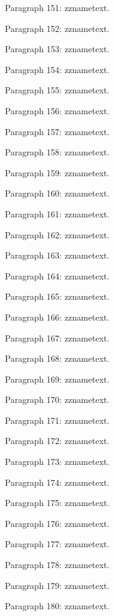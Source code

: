 \documentclass{article}
\begin{document}
Paragraph 151: \csname zzname\endcsname text.

Paragraph 152: \csname zzname\endcsname text.

Paragraph 153: \csname zzname\endcsname text.

Paragraph 154: \csname zzname\endcsname text.

Paragraph 155: \csname zzname\endcsname text.

Paragraph 156: \csname zzname\endcsname text.

Paragraph 157: \csname zzname\endcsname text.

Paragraph 158: \csname zzname\endcsname text.

Paragraph 159: \csname zzname\endcsname text.

Paragraph 160: \csname zzname\endcsname text.

Paragraph 161: \csname zzname\endcsname text.

Paragraph 162: \csname zzname\endcsname text.

Paragraph 163: \csname zzname\endcsname text.

Paragraph 164: \csname zzname\endcsname text.

Paragraph 165: \csname zzname\endcsname text.

Paragraph 166: \csname zzname\endcsname text.

Paragraph 167: \csname zzname\endcsname text.

Paragraph 168: \csname zzname\endcsname text.

Paragraph 169: \csname zzname\endcsname text.

Paragraph 170: \csname zzname\endcsname text.

Paragraph 171: \csname zzname\endcsname text.

Paragraph 172: \csname zzname\endcsname text.

Paragraph 173: \csname zzname\endcsname text.

Paragraph 174: \csname zzname\endcsname text.

Paragraph 175: \csname zzname\endcsname text.

Paragraph 176: \csname zzname\endcsname text.

Paragraph 177: \csname zzname\endcsname text.

Paragraph 178: \csname zzname\endcsname text.

Paragraph 179: \csname zzname\endcsname text.

Paragraph 180: \csname zzname\endcsname text.
\end{document}
